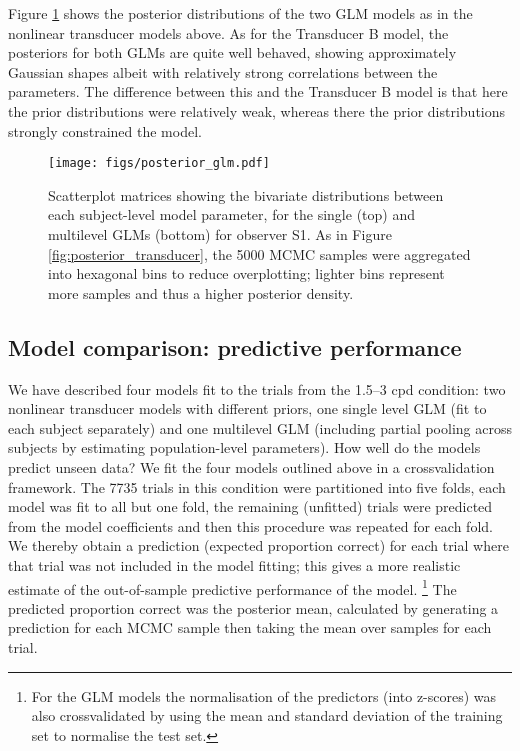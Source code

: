 \documentclass[11pt,a4paper]{article}
\begin{document}
{Figure \ref{fig:posterior_glm} shows the posterior distributions of the two GLM models as in the nonlinear transducer models above.
As for the Transducer B model, the posteriors for both GLMs are quite well behaved, showing approximately Gaussian shapes albeit with relatively strong correlations between the parameters.
The difference between this and the Transducer B model is that here the prior distributions were relatively weak, whereas there the prior distributions strongly constrained the model.

\begin{figure}[H]
\begin{center}
\texttt{[image: figs/posterior\_glm.pdf]}
\end{center}
\caption{
Scatterplot matrices showing the bivariate distributions between each subject-level model parameter, for the single (top) and multilevel GLMs (bottom) for observer S1.
As in Figure \ref{fig:posterior_transducer}, the 5000 MCMC samples were aggregated into hexagonal bins to reduce overplotting; lighter bins represent more samples and thus a higher posterior density.
}
\label{fig:posterior_glm}
\end{figure}


\subsection{Model comparison: predictive performance}

We have described four models fit to the trials from the 1.5--3 cpd condition: two nonlinear transducer models with different priors, one single level GLM (fit to each subject separately) and one multilevel GLM (including partial pooling across subjects by estimating population-level parameters).
How well do the models predict unseen data?
We fit the four models outlined above in a crossvalidation framework.
The 7735 trials in this condition were partitioned into five folds, each model was fit to all but one fold, the remaining (unfitted) trials were predicted from the model coefficients and then this procedure was repeated for each fold.
We thereby obtain a prediction (expected proportion correct) for each trial where that trial was not included in the model fitting; this gives a more realistic estimate of the out-of-sample predictive performance of the model.
\footnote{For the GLM models the normalisation of the predictors (into z-scores) was also crossvalidated by using the mean and standard deviation of the training set to normalise the test set.}
The predicted proportion correct was the posterior mean, calculated by generating a prediction for each MCMC sample then taking the mean over samples for each trial.

}
\end{document}
